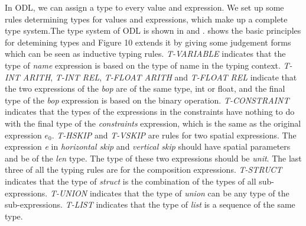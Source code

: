 In ODL, we can assign a type to every value and expression. We set up some rules  determining types for values and expressions, which make up a complete type system.The type system of ODL is shown in  and .  shows the basic principles for detemining types and Figure 10 extends it by giving some judgement forms which can be seen as inductive typing rules.
\textit{T-VARIABLE} indicates that the type of \textit{name} expression is based on
the type of name in the typing context. \textit{T-INT ARITH}, \textit{T-INT REL},
\textit{T-FLOAT ARITH} and \textit{T-FLOAT REL}
indicate that the two expressions of the \textit{bop} are of the same type, int or float, and
the final type of the \textit{bop} expression is based on the binary operation.
\textit{T-CONSTRAINT} indicates that the types of the expressions
in the constraints have nothing to do with the
final type of the \textit{constraints} expression, which is the same as the original
expression \textit{$e_0$}.
\textit{T-HSKIP} and \textit{T-VSKIP} are rules for two spatial expressions.
The expression \textit{e} in \textit{horizontal skip} and \textit{vertical skip}
should have spatial parameters and be of the \textit{len} type. The type of
these two expressions should be \textit{unit}. The last three of all the typing rules are for
the composition expressions. \textit{T-STRUCT} indicates that the type
of \textit{struct} is the combination of the types of all sub-expressions.
\textit{T-UNION} indicates that the type of \textit{union} can be
any type of the sub-expressions. \textit{T-LIST} indicates that the type of
\textit{list} is a sequence of the same type.
